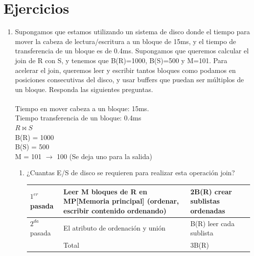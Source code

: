 \documentclass{templateNote}
\begin{document}


\portada
\margenes 


\section{Ejercicios}

\begin{enumerate}
    \item Supongamos que estamos utilizando un sistema de disco donde el tiempo para mover la cabeza de lectura/escritura a un bloque de 15ms, y el tiempo de transferencia de un bloque es de 0.4ms. Supongamos que queremos calcular el join de R con S, y tenemos que B(R)=1000, B(S)=500 y M=101. Para acelerar el join, queremos leer y escribir tantos bloques como podamos en posiciones consecutivas del disco, y usar buffers que puedan ser múltiplos de un bloque. Responda las siguientes preguntas. \\\\
    Tiempo en mover cabeza a un bloque: 15ms.\\
    Tiempo transferencia de un bloque: 0.4ms \\
    \underline{$R \Join S$}\\
    \hspace*{0.25cm} B(R) = 1000 \\
    \hspace*{0.25cm} B(S) = 500 \\
    \hspace*{0.25cm} M = 101 $\rightarrow$ 100 (Se deja uno para la salida)\\
    \begin{enumerate}[label=\alph*)]
        \item ¿Cuantas E/S de disco se requieren para realizar esta operación join? \\

        \begin{tabular}{|m{2cm}|m{6cm}|m{4cm}|}
            \hline
            $1^{er}$ pasada & Leer M bloques de R en MP[Memoria principal] (ordenar, escribir contenido ordenando) & 2B(R) crear sublistas ordenadas \\
            \hline
            $2^{da}$ pasada & El atributo de ordenación y unión & B(R) leer cada sublista \\
            \hline
            & Total & 3B(R) \\
            \hline
        \end{tabular}
        

\end{enumerate}
\end{enumerate}
\end{document}
